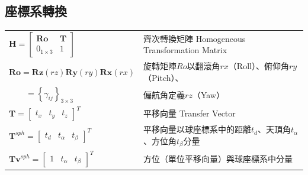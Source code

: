 \onehalfspacing

\subsection*{座標系轉換}

\begin{longtable}[l]{ll}
    $\boldsymbol{H}=\left[\begin{array}{cc}
         \boldsymbol{Ro}  & \boldsymbol{T} \\
        0_{1\times3} & 1
        \end{array}\right]$ & 齊次轉換矩陣 Homogeneous Transformation Matrix\\
    $\boldsymbol{Ro}=\boldsymbol{Rz}(rz)\boldsymbol{Ry}(ry)\boldsymbol{Rx}(rx)$ & 旋轉矩陣$Ro$以翻滾角$rx$（Roll）、俯仰角$ry$（Pitch）、\\
    $\qquad=\left\{\gamma_{ij}\right\}_{3\times 3}$    &偏航角定義$rz$（Yaw）\\%
    $\boldsymbol{T}=\left[\begin{array}{ccc}t_x&t_y&t_z\end{array}\right]^T$ & 平移向量 Transfer Vector\\
    $\boldsymbol{T}^{sph}=\left[\begin{array}{ccc}t_d&t_{\alpha}&t_{\beta}\end{array}\right]^T$ & 平移向量以球座標系中的距離$t_d$、天頂角$t_{\alpha}$、方位角$t_{\beta}$分量\\
    $\boldsymbol{Tv}^{sph}=\left[\begin{array}{ccc}1&t_{\alpha}&t_{\beta}\end{array}\right]^T$ & 方位（單位平移向量）與球座標系中分量\\
\end{longtable}






